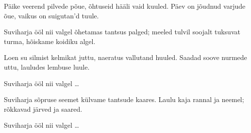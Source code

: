 P\"aike veerend pilvede p\~oue,
\~ohtuseid h\"a\"ali vaid kuuled.
P\"aev on j\~oudnud varjude \~oue,
vaikus on suigutan'd tuule.

Suviharja \"o\"ol nii valgel
\~ohetamas tantsus palged;
meeled tulvil soojalt tuksuvat turma,
h\~oiskame koidiku algel.

Loen su silmist kelmikat juttu,
naeratus vallutand huuled.
Saadad soove nurmede uttu,
lauludes lembuse luule.

Suviharja \"o\"ol nii valgel \ldots

Suviharja s\~opruse seemet
k\"ulvame tantsude kaares.
Laulu kaja rannal ja neemel;
r\~okkavad j\"arved ja saared.

Suviharja \"o\"ol nii valgel \ldots